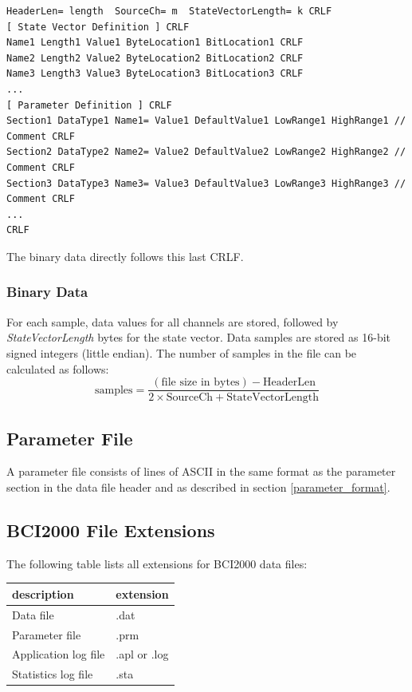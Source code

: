 \documentclass[letterpaper,oneside,12pt]{book}
\begin{document}
\begin{flushleft}
\begin{footnotesize}
\begin{verbatim}
HeaderLen= length  SourceCh= m  StateVectorLength= k CRLF
[ State Vector Definition ] CRLF
Name1 Length1 Value1 ByteLocation1 BitLocation1 CRLF
Name2 Length2 Value2 ByteLocation2 BitLocation2 CRLF
Name3 Length3 Value3 ByteLocation3 BitLocation3 CRLF
...
[ Parameter Definition ] CRLF
Section1 DataType1 Name1= Value1 DefaultValue1 LowRange1 HighRange1 // Comment CRLF
Section2 DataType2 Name2= Value2 DefaultValue2 LowRange2 HighRange2 // Comment CRLF
Section3 DataType3 Name3= Value3 DefaultValue3 LowRange3 HighRange3 // Comment CRLF
...
CRLF
\end{verbatim}
\end{footnotesize}
\end{flushleft}
The binary data directly follows this last CRLF.

\subsubsection{Binary Data}
\label{binary_data}

For each sample, data values for all channels are stored, followed by \textit{StateVectorLength} bytes for the state vector.
Data samples are stored as 16-bit signed integers (little 
endian).
The number of samples in the file can be calculated as follows: 
$$
  \textrm{samples}
    =\frac{(\textrm{file size in bytes})-\textrm{HeaderLen}}
    {2\times\textrm{SourceCh}+\textrm{StateVectorLength}}
$$

\subsection{Parameter File}

A parameter file consists of lines of ASCII in the same format as the parameter section in the data file header and as described in section \ref{parameter_format}.

\newpage
\subsection{BCI2000 File Extensions}

The following table lists all extensions for BCI2000 data files:
\vspace{0.5cm}\\
\begin{centering}
 \centering
 \begin{tabular}{|l|l|}
  \hline
  \textbf{description} & \textbf{extension} \\
  \hline
  Data file & .dat \\
  \hline
  Parameter file & .prm \\
  \hline
  Application log file & .apl or .log \\
  \hline
  Statistics log file & .sta \\
  \hline
 \end{tabular}
\end{centering}   
\end{document}
